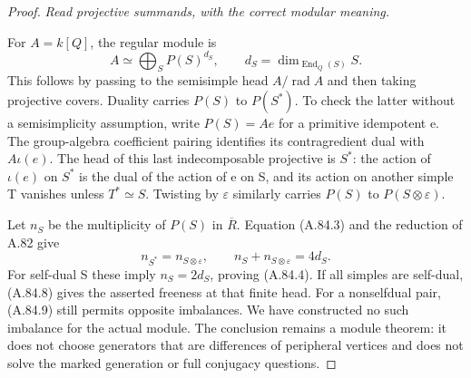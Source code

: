 \begin{proof}
\emph{Read projective summands, with the correct modular meaning.}\par
For \(A=k[Q]\), the regular module is
\[
 A\simeq\bigoplus_S P(S)^{d_S},\qquad
                         d_S=\dim_{\operatorname{End}_Q(S)}S.
 \tag{A.84.8}
\]
This follows by passing to the semisimple head \(A/\operatorname{rad}A\)
and then taking projective covers. Duality carries \(P(S)\) to
\(P(S^*)\). To check the latter without a semisimplicity assumption,
write \(P(S)=Ae\) for a primitive idempotent e. The group-algebra
coefficient pairing identifies its contragredient dual with
\(A\iota(e)\). The head of this last indecomposable projective is
\(S^*\): the action of \(\iota(e)\) on \(S^*\) is the dual of the
action of e on S, and its action on another simple T vanishes unless
\(T^*\simeq S\). Twisting by \(\varepsilon\) similarly carries
\(P(S)\) to \(P(S\otimes\varepsilon)\).

Let \(n_S\) be the multiplicity of \(P(S)\) in \(\overline R\).
Equation (A.84.3) and the reduction of A.82 give
\[
 n_{S^*}=n_{S\otimes\varepsilon},\qquad
                  n_S+n_{S\otimes\varepsilon}=4d_S.
 \tag{A.84.9}
\]
For self-dual S these imply \(n_S=2d_S\), proving (A.84.4).
If all simples are self-dual, (A.84.8) gives the asserted freeness
at that finite head. For a nonselfdual pair, (A.84.9) still permits
opposite imbalances. We have constructed no such imbalance for the
actual module. The conclusion remains a module theorem: it does not
choose generators that are differences of peripheral vertices and
does not solve the marked generation or full conjugacy questions.
\end{proof}
